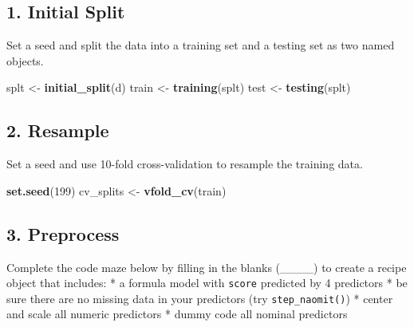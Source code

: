 \documentclass[
]{article}
\newenvironment{Shaded}{\begin{snugshade}}{\end{snugshade}}
\newcommand{\DecValTok}[1]{\textcolor[rgb]{0.00,0.00,0.81}{#1}}
\newcommand{\KeywordTok}[1]{\textcolor[rgb]{0.13,0.29,0.53}{\textbf{#1}}}
\newcommand{\NormalTok}[1]{#1}
\newcommand{\StringTok}[1]{\textcolor[rgb]{0.31,0.60,0.02}{#1}}
\begin{document}
\hypertarget{initial-split}{%
\subsection{1. Initial Split}\label{initial-split}}

Set a seed and split the data into a training set and a testing set as
two named objects.

\begin{Shaded}
\begin{Highlighting}[]
\NormalTok{splt <-}\StringTok{ }\KeywordTok{initial_split}\NormalTok{(d)}
\NormalTok{train <-}\StringTok{ }\KeywordTok{training}\NormalTok{(splt)}
\NormalTok{test <-}\StringTok{ }\KeywordTok{testing}\NormalTok{(splt)}
\end{Highlighting}
\end{Shaded}

\hypertarget{resample}{%
\subsection{2. Resample}\label{resample}}

Set a seed and use 10-fold cross-validation to resample the training
data.

\begin{Shaded}
\begin{Highlighting}[]
\KeywordTok{set.seed}\NormalTok{(}\DecValTok{199}\NormalTok{)}
\NormalTok{cv_splits <-}\StringTok{ }\KeywordTok{vfold_cv}\NormalTok{(train)}
\end{Highlighting}
\end{Shaded}

\hypertarget{preprocess}{%
\subsection{3. Preprocess}\label{preprocess}}

Complete the code maze below by filling in the blanks (\_\_\_\_) to
create a recipe object that includes: * a formula model with
\texttt{score} predicted by 4 predictors * be sure there are no missing
data in your predictors (try \texttt{step\_naomit()}) * center and scale
all numeric predictors * dummy code all nominal predictors
\end{document}
